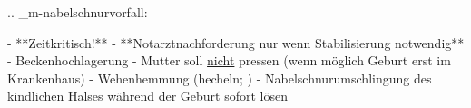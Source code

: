 
.. _m-nabelschnurvorfall:


\begin{itemize}
  -   **Zeitkritisch!**
    -   **Notarztnachforderung nur wenn Stabilisierung
    notwendig**
	-   Beckenhochlagerung
	-   Mutter soll \underline{nicht} pressen (wenn möglich Geburt erst im
	Krankenhaus)
	-   Wehenhemmung (hecheln; )
	-   Nabelschnurumschlingung des kindlichen Halses während der Geburt sofort lösen
\end{itemize}